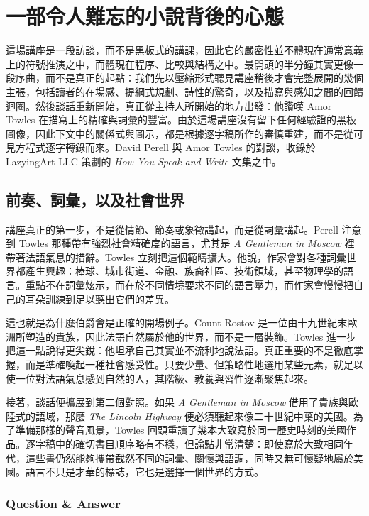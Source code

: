 \chapter{一部令人難忘的小說背後的心態}

這場講座是一段訪談，而不是黑板式的講課，因此它的嚴密性並不體現在通常意義上的符號推演之中，而體現在程序、比較與結構之中。最開頭的半分鐘其實更像一段序曲，而不是真正的起點：我們先以壓縮形式聽見講座稍後才會完整展開的幾個主張，包括讀者的在場感、提綱式規劃、詩性的驚奇，以及描寫與感知之間的回饋迴圈。然後談話重新開始，真正從主持人所開始的地方出發：他讚嘆 Amor Towles 在描寫上的精確與詞彙的豐富。由於這場講座沒有留下任何經驗證的黑板圖像，因此下文中的關係式與圖示，都是根據逐字稿所作的審慎重建，而不是從可見方程式逐字轉錄而來。David Perell 與 Amor Towles 的對談，收錄於 LazyingArt LLC 策劃的 \emph{How You Speak and Write} 文集之中。

\section{前奏、詞彙，以及社會世界}

講座真正的第一步，不是從情節、節奏或象徵講起，而是從詞彙講起。Perell 注意到 Towles 那種帶有強烈社會精確度的語言，尤其是 \emph{A Gentleman in Moscow} 裡帶著法語氣息的措辭。Towles 立刻把這個範疇擴大。他說，作家會對各種詞彙世界都產生興趣：棒球、城市街道、金融、族裔社區、技術領域，甚至物理學的語言。重點不在詞彙炫示，而在於不同情境要求不同的語言壓力，而作家會慢慢把自己的耳朵訓練到足以聽出它們的差異。

這也就是為什麼伯爵會是正確的開場例子。Count Rostov 是一位由十九世紀末歐洲所塑造的貴族，因此法語自然屬於他的世界，而不是一層裝飾。Towles 進一步把這一點說得更尖銳：他坦承自己其實並不流利地說法語。真正重要的不是徹底掌握，而是準確喚起一種社會感受性。只要少量、但策略性地選用某些元素，就足以使一位對法語氣息感到自然的人，其階級、教養與習性逐漸聚焦起來。

接著，談話便擴展到第二個對照。如果 \emph{A Gentleman in Moscow} 借用了貴族與歐陸式的語域，那麼 \emph{The Lincoln Highway} 便必須聽起來像二十世紀中葉的美國。為了準備那樣的聲音風景，Towles 回頭重讀了幾本大致寫於同一歷史時刻的美國作品。逐字稿中的確切書目順序略有不穩，但論點非常清楚：即使寫於大致相同年代，這些書仍然能夠攜帶截然不同的詞彙、關懷與語調，同時又無可懷疑地屬於美國。語言不只是才華的標誌，它也是選擇一個世界的方式。

\subsection{Question \& Answer}

